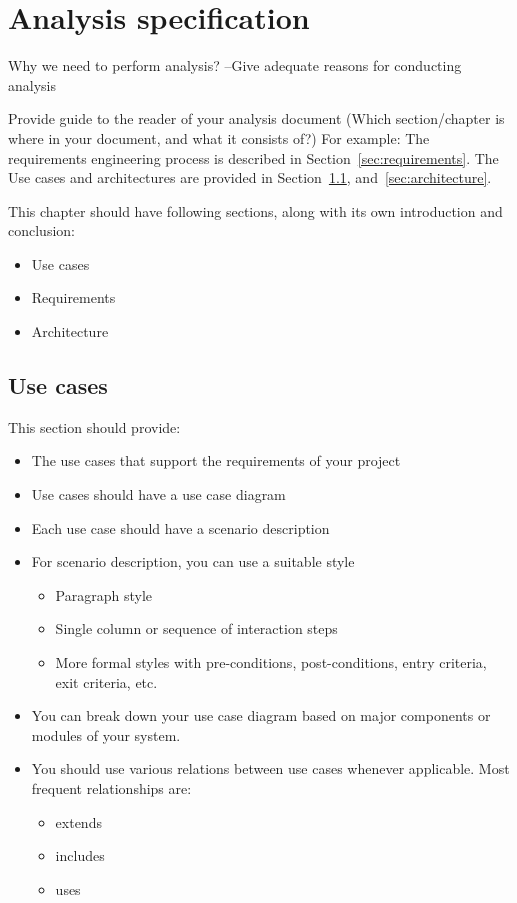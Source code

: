 \chapter{Analysis specification} %
\label{cha:analysis}

Why we need to perform analysis? --Give adequate reasons for conducting analysis

Provide guide to the reader of your analysis document (Which section/chapter is where in your document, and what it consists of?) For example: The requirements engineering process is described in Section~\ref{sec:requirements}. The Use cases and architectures are provided in Section~\ref{sec:use_cases}, and~\ref{sec:architecture}.

This chapter should have following sections, along with its own introduction and conclusion:
\begin{itemize}
  \item Use cases
  \item Requirements
  \item Architecture
\end{itemize}

\section{Use cases} %
\label{sec:use_cases}
This section should provide:
\begin{itemize}
	\item The use cases that support the requirements of your project
	\item Use cases should have a use case diagram
	\item Each use case should have a scenario description
	\item For scenario description, you can use a suitable style
	\begin{itemize}
		\item Paragraph style
		\item Single column or sequence of interaction steps
		\item More formal styles with pre-conditions, post-conditions, entry criteria, exit criteria, etc.
	\end{itemize}
	\item You can break down your use case diagram based on major components or modules of your system. 
	\item You should use various relations between use cases whenever applicable. Most frequent relationships are: 
	\begin{itemize}
		\item extends
		\item includes
		\item uses
	\end{itemize}
\end{itemize}

